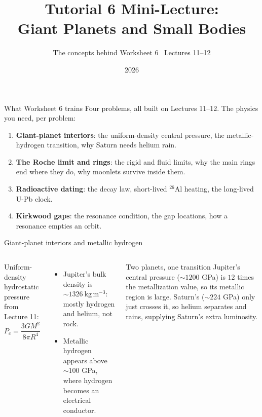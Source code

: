 \documentclass[aspectratio=169, 11pt]{beamer}
\title[T6 mini-lecture: Giant Planets and Small Bodies]{Tutorial 6 Mini-Lecture:\\Giant Planets and Small Bodies}
\subtitle{The concepts behind Worksheet 6 \textbullet\ Lectures 11--12}
\author{}
\institute{Kapteyn Astronomical Institute\\University of Groningen}
\date{2026}
\begin{document}
\begin{frame}
  \titlepage
\end{frame}

\begin{frame}{What Worksheet 6 trains}
  Four problems, all built on Lectures 11--12. The physics you need, per problem:
  \vskip4pt\relax
  \begin{enumerate}
    \item \textbf{Giant-planet interiors}: the uniform-density central pressure, the metallic-hydrogen transition, why Saturn needs helium rain.
    \item \textbf{The Roche limit and rings}: the rigid and fluid limits, why the main rings end where they do, why moonlets survive inside them.
    \item \textbf{Radioactive dating}: the decay law, short-lived $^{26}$Al heating, the long-lived U-Pb clock.
    \item \textbf{Kirkwood gaps}: the resonance condition, the gap locations, how a resonance empties an orbit.
  \end{enumerate}
  \vskip2pt\relax
\end{frame}

\begin{frame}{Giant-planet interiors and metallic hydrogen}
  \small
  \begin{columns}[T]
    Uniform-density hydrostatic pressure from Lecture 11:
    \[
      \boxed{P_c = \frac{3GM^2}{8\pi R^4}}
    \]
    \begin{itemize}
      \item Jupiter's bulk density is $\sim 1326\ \mathrm{kg\,m^{-3}}$: mostly hydrogen and helium, not rock.
      \item Metallic hydrogen appears above $\sim 100$ GPa, where hydrogen becomes an electrical conductor.
    \end{itemize}

    \begin{block}{Two planets, one transition}
      Jupiter's central pressure ($\sim 1200$ GPa) is $12$ times the metallization value, so its metallic region is large. Saturn's ($\sim 224$ GPa) only just crosses it, so helium separates and rains, supplying Saturn's extra luminosity.
    \end{block}
  \end{columns}
\end{frame}
\end{document}
